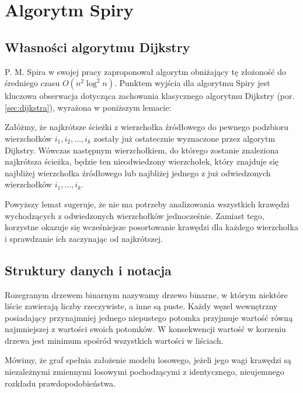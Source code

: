 \chapter{Algorytm Spiry}

\section{Własności algorytmu Dijkstry}
P. M. Spira w swojej pracy \cite{Spira1973} zaproponował algorytm obniżający tę złożoność do średniego czasu $O(n^2 \log^2 n)$. Punktem wyjścia dla algorytmu Spiry jest kluczowa obserwacja dotycząca zachowania klasycznego algorytmu Dijkstry (por. \ref{sec:dijkstra}), wyrażona w poniższym lemacie:

\begin{lemat}
Załóżmy, że najkrótsze ścieżki z wierzchołka źródłowego do pewnego podzbioru wierzchołków $i_1, i_2, \ldots, i_k$ zostały już ostatecznie wyznaczone przez algorytm Dijkstry. Wówczas następnym wierzchołkiem, do którego zostanie znaleziona najkrótsza ścieżka, będzie ten nieodwiedzony wierzchołek, który znajduje się najbliżej wierzchołka źródłowego lub najbliżej jednego z już odwiedzonych wierzchołków $i_1, \ldots, i_k$.
\end{lemat}

Powyższy lemat sugeruje, że nie ma potrzeby analizowania wszystkich krawędzi wychodzących z odwiedzonych wierzchołków jednocześnie. Zamiast tego, korzystne okazuje się wcześniejsze posortowanie krawędzi dla każdego wierzchołka i sprawdzanie ich zaczynając od najkrótszej.

\section{Struktury danych i notacja}

\begin{definicja}
Rozegranym drzewem binarnym nazywamy drzewo binarne, w którym niektóre liście zawierają liczby rzeczywiste, a inne są puste. Każdy węzeł wewnętrzny posiadający przynajmniej jednego niepustego potomka przyjmuje wartość równą najmniejszej z wartości swoich potomków. W konsekwencji wartość w korzeniu drzewa jest minimum spośród wszystkich wartości w liściach.
\end{definicja}

\begin{definicja}
Mówimy, że graf spełnia założenie modelu losowego, jeżeli jego wagi krawędzi są niezależnymi zmiennymi losowymi pochodzącymi z identycznego, nieujemnego rozkładu prawdopodobieństwa.
\end{definicja}

